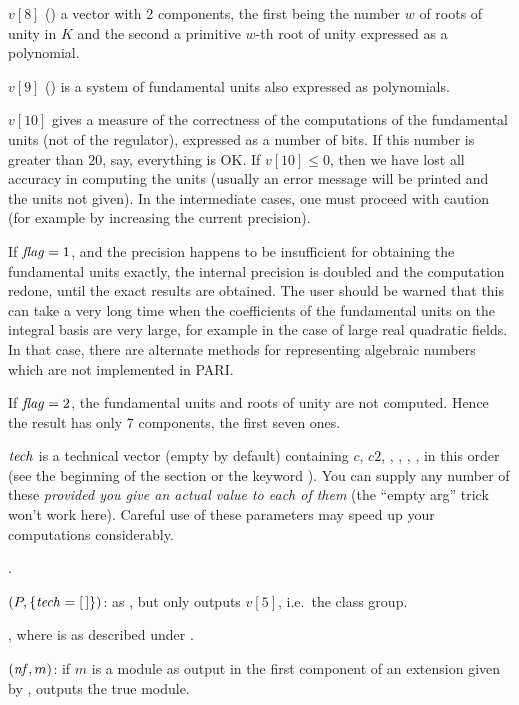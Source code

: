  $v[8]$ () a vector with 2 components, the first being the number
$w$ of roots of unity in $K$ and the second a primitive $w$-th root of unity
expressed as a polynomial.

 $v[9]$ () is a system of fundamental units also expressed as
polynomials.

 $v[10]$ gives a measure of the correctness of the computations of the
fundamental units (not of the regulator), expressed as a number of bits. If
this number is greater than $20$, say, everything is OK. If $v[10]\le0$,
then we have lost all accuracy in computing the units (usually an error
message will be printed and the units not given). In the intermediate cases,
one must proceed with caution (for example by increasing the current
precision).

If $\hbox{\it f\kern0pt lag\/}=1$, and the precision happens to be insufficient for obtaining the
fundamental units exactly, the internal precision is doubled and the
computation redone, until the exact results are obtained. The user should be
warned that this can take a very long time when the coefficients of the
fundamental units on the integral basis are very large, for example in the
case of large real quadratic fields. In that case, there are alternate
methods for representing algebraic numbers which are not implemented in PARI.

If $\hbox{\it f\kern0pt lag\/}=2$, the fundamental units and roots of unity are not computed.
Hence the result has only 7 components, the first seven ones.

$\hbox{\it tech\/}$ is a technical vector (empty by default) containing $c$, $c2$,
, , , , in this order (see
the beginning of the section or the keyword ).
You can supply any number of these \emph{provided you give an actual value to
each of them} (the ``empty arg'' trick won't work here). Careful use of these
parameters may speed up your computations considerably.

.

$(P,\{\hbox{\it tech\/}=[\,]\})$: as , but only
outputs $v[5]$, i.e.~the class group.

, where 
is as described under .

$(\hbox{\it nf\/},m)$: if $m$ is a module as output in the
first component of an extension given by , outputs the
true module.


